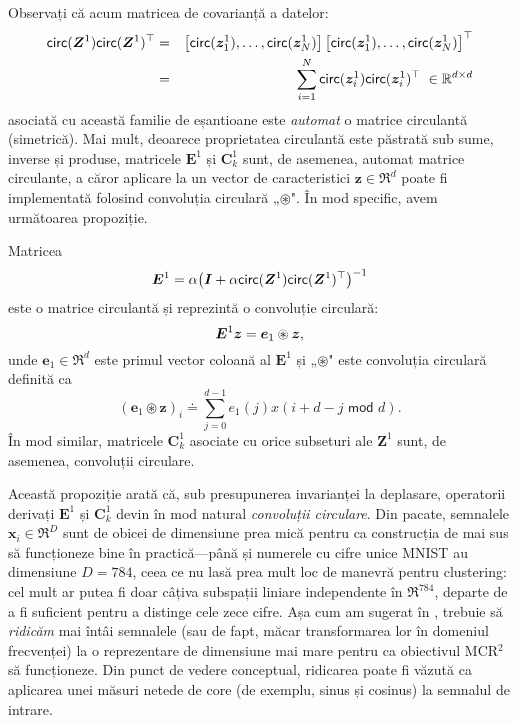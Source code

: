 \documentclass[../../book-main_ro.tex]{subfiles}
\begin{document}
Observați că acum matricea de covarianță a datelor: 
\begin{eqnarray}
\mathsf{circ}(\bm Z^1) \mathsf{circ}(\bm Z^1)^\top 
&=& \left[ \mathsf{circ}(\bm{z}_{1}^1), \dots, \mathsf{circ}(\bm{z}_{N}^1) \right] \left[ \mathsf{circ}(\bm{z}_{1}^1), \dots, \mathsf{circ} (\bm{z}_{N}^1) \right]^\top \nonumber \\
&=& \sum_{i =1}^N \mathsf{circ}(\bm{z}_{i}^1) \mathsf{circ}(\bm{z}_{i}^1)^\top \;\in \mathbb{R}^{d\times d} 
\end{eqnarray}
asociată cu această familie de eșantioane este {\em automat} o matrice circulantă (simetrică). Mai mult, deoarece proprietatea circulantă este păstrată sub sume, inverse și produse, matricele $\bm E^1$ și $\bm C^1_k$ sunt, de asemenea, automat matrice circulante, a căror aplicare la un vector de caracteristici $\bm z \in \Re^d$ poate fi implementată folosind convoluția circulară „$\circledast$".
În mod specific, avem următoarea propoziție. 

\begin{proposition}
Matricea 
\begin{equation}
    \bm E^1 = \alpha\big(\bm I + \alpha \mathsf{circ}(\bm Z^1) \mathsf{circ}(\bm Z^1)^\top \big)^{-1}
\end{equation}
este o matrice circulantă și reprezintă o convoluție circulară: 
$$\bm E^1 \bm{z} = \bm e_1 \circledast \bm{z},$$ 
unde $\bm e_1 \in \Re^d$ este primul vector coloană al $\bm E^1$ și „$\circledast$" este convoluția circulară definită ca
\begin{equation*}
    (\bm e_1 \circledast \bm z)_{i} \doteq \sum_{j=0}^{d-1} e_1(j) x(i+ d-j \,\, \textsf{mod} \,\,d).
\end{equation*}
În mod similar, matricele $\bm C^1_k$ asociate cu orice subseturi ale $\bm Z^1$ sunt, de asemenea, convoluții circulare. 
\label{prop:circular-conv-1}
\end{proposition}

Această propoziție arată că, sub presupunerea invarianței la deplasare, operatorii derivați $\bm E^1$ și $\bm C^1_k$ devin în mod natural {\em convoluții circulare}. Din pacate, semnalele $\bm x_i \in \Re^D$ sunt de obicei de dimensiune prea mică pentru ca construcția de mai sus să funcționeze bine în practică---până și numerele cu cifre unice MNIST au dimensiune $D = 784$, ceea ce nu lasă prea mult loc de manevră pentru clustering: cel mult ar putea fi doar câțiva subspații liniare independente în $\Re^{784}$, departe de a fi suficient pentru a distinge cele zece cifre. Așa cum am sugerat în , trebuie să {\em ridicăm} mai întâi semnalele (sau de fapt, măcar transformarea lor în domeniul frecvenței) la o reprezentare de dimensiune mai mare pentru ca obiectivul MCR$^2$ să funcționeze. Din punct de vedere conceptual, ridicarea poate fi văzută ca aplicarea unei măsuri netede de core (de exemplu, sinus și cosinus) la semnalul de intrare. 
\end{document}
